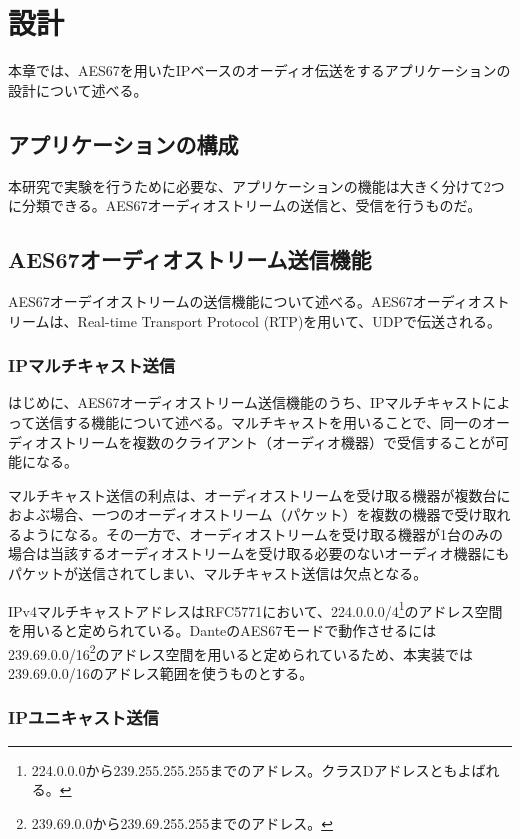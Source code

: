 \chapter{設計}
\label{chap:design}

本章では、AES67を用いたIPベースのオーディオ伝送をするアプリケーションの設計について述べる。

\section{アプリケーションの構成}

本研究で実験を行うために必要な、アプリケーションの機能は大きく分けて2つに分類できる。AES67オーディオストリームの送信と、受信を行うものだ。

\section{AES67オーディオストリーム送信機能}

AES67オーデイオストリームの送信機能について述べる。AES67オーディオストリームは、Real-time Transport Protocol (RTP)\cite{rfc3550}\cite{rfc3551}を用いて、UDPで伝送される。

\subsection{IPマルチキャスト送信}

はじめに、AES67オーディオストリーム送信機能のうち、IPマルチキャストによって送信する機能について述べる。マルチキャストを用いることで、同一のオーディオストリームを複数のクライアント（オーディオ機器）で受信することが可能になる。

マルチキャスト送信の利点は、オーディオストリームを受け取る機器が複数台におよぶ場合、一つのオーディオストリーム（パケット）を複数の機器で受け取れるようになる。その一方で、オーディオストリームを受け取る機器が1台のみの場合は当該するオーディオストリームを受け取る必要のないオーディオ機器にもパケットが送信されてしまい、マルチキャスト送信は欠点となる。

IPv4マルチキャストアドレスはRFC5771\cite{rfc5771}において、224.0.0.0/4\footnote{224.0.0.0から239.255.255.255までのアドレス。クラスDアドレスともよばれる。}のアドレス空間を用いると定められている。DanteのAES67モードで動作させるには239.69.0.0/16\footnote{239.69.0.0から239.69.255.255までのアドレス。}のアドレス空間を用いると定められているため、本実装では239.69.0.0/16のアドレス範囲を使うものとする。

\subsection{IPユニキャスト送信}

